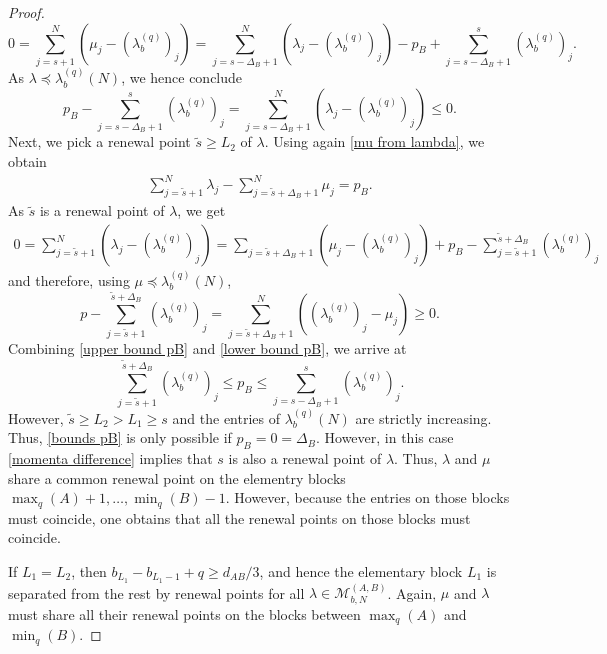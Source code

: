 \documentclass[10pt,a4paper]{amsart}
\begin{document}
\begin{proof}
\begin{equation}
		0 = \sum_{j=s+1}^N (\mu_j-(\lambda_b^{(q)})_j)
		= \sum_{j=s-\Delta_B+1}^N (\lambda_j-(\lambda_b^{(q)})_j) -p_B + \sum_{j=s-\Delta_B+1}^s (\lambda_b^{(q)})_j.
	\end{equation}
	As $\lambda \preceq \lambda_b^{(q)}(N)$, we hence conclude
	\begin{equation} \label{upper bound pB}
		p_B - \sum_{j=s-\Delta_B+1}^s (\lambda_b^{(q)})_j = \sum_{j=s-\Delta_B+1}^N (\lambda_j-(\lambda_b^{(q)})_j) \leq 0.
	\end{equation}
	Next, we pick a renewal point $\tilde{s}\geq L_2$ of $\lambda$. Using again \eqref{mu from lambda}, we obtain
	\begin{align*}
		\sum_{j=\tilde{s}+1}^N \lambda_j - \sum_{j=\tilde{s}+\Delta_B+1}^N \mu_j = p_B.
	\end{align*}
	As $\tilde{s}$ is a renewal point of $\lambda$, we get
	\begin{align*}
		0 = \sum_{j=\tilde{s}+1}^N (\lambda_j-(\lambda_b^{(q)})_j)
		= \sum_{j=\tilde{s}+\Delta_B+1} (\mu_j -(\lambda_b^{(q)})_j) + p_B -\sum_{j=\tilde{s}+1}^{\tilde{s}+\Delta_B} (\lambda_b^{(q)})_j
	\end{align*}
	and therefore, using $\mu \preceq \lambda_b^{(q)}(N)$, 
	\begin{equation} \label{lower bound pB}
		p-\sum_{j=\tilde{s}+1}^{\tilde{s}+\Delta_B} (\lambda_b^{(q)})_j = \sum_{j=\tilde{s}+\Delta_B+1}^N ((\lambda_b^{(q)})_j-\mu_j) \geq 0.
	\end{equation}
	Combining \eqref{upper bound pB} and \eqref{lower bound pB}, we arrive at
	\begin{equation} \label{bounds pB}
		\sum_{j=\tilde{s}+1}^{\tilde{s}+\Delta_B} (\lambda_b^{(q)})_j \leq p_B \leq \sum_{j=s-\Delta_B+1}^s (\lambda_b^{(q)})_j.
	\end{equation}
	However, $\tilde{s}\geq L_2>L_1\geq s$ and the entries of $\lambda_b^{(q)}(N)$ are strictly increasing. Thus, \eqref{bounds pB} is only possible if $p_B=0=\Delta_B$. However, in this case \eqref{momenta difference} implies that $s$ is also a renewal point of $\lambda$. Thus, $\lambda$ and $\mu$ share a common renewal point  on the elementry blocks $ \max_q(A)+1, \dots , \min_q(B)-1$. However, because the entries on those blocks must coincide, one obtains that all the renewal points on those blocks must coincide.
	
	If $L_1=L_2$, then $
		b_{L_1}-b_{L_1-1} +q  \geq d_{AB}/3 $, and hence the elementary block $ L_1 $ is separated from the rest by renewal points for all
	$\lambda\in \mathcal{M}_{b,N}^{(A,B)}$. Again, $\mu$ and $\lambda$ must share all their renewal points on the blocks between $ \max_q(A)$ and $  \min_q(B)$. 
	

\end{proof}
\end{document}

